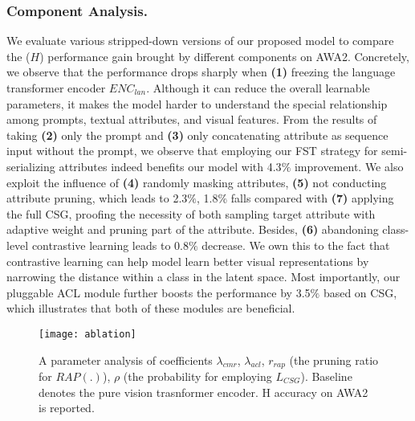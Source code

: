 \documentclass[letterpaper]{article} \usepackage{aaai23}  \usepackage{times}  \usepackage{helvet}  \usepackage{courier}  \usepackage[hyphens]{url}  \usepackage{graphicx} \urlstyle{rm} \def\UrlFont{\rm}  \usepackage{natbib}  \usepackage{caption} \frenchspacing  \setlength{\pdfpagewidth}{8.5in}  \setlength{\pdfpageheight}{11in}  \usepackage{algorithm}
\newcommand{\fy}[1]{{\color{black}#1}}
\begin{document}
\subsubsection{\textbf{Component Analysis.}}
We evaluate various stripped-down versions of our proposed model to compare the  ($H$) performance gain brought by different components on AWA2.
Concretely, we observe that the performance drop{s} sharply when 
\textbf{(1)} freezing the language transformer encoder $ENC_{lan}$. Although it
  \fy{can} reduce the overall learnable parameters, it makes the model hard{er} to understand the special relationship among prompts, textual attributes, and visual features.
From the results of taking \textbf{(2)} only the prompt and \textbf{(3)} only concatenating attribute as sequence input without the prompt, we observe that employing our FST strategy for semi-serializing attributes
indeed benefit{s} our model with 4.3$\%$ improvement.
We also exploit the influence of \textbf{(4)} {randomly} masking attributes, \textbf{(5)}  not conducting attribute pruning, which leads to 2.3$\%$, 1.8$\%$ falls compared with \textbf{(7)} applying the full CSG, proofing the necessity of both sampling target attribute with adaptive weight and pruning part of the attribute.
Besides,  \textbf{(6)} abandoning class-level contrastive learning leads to 0.8$\%$ decrease.
We own this to the fact that contrastive learning can help model learn better visual representations by narrowing  the distance within a class in the latent space.
Most importantly, our pluggable ACL module {further}
boosts the  performance by 3.5$\%$ based on CSG, which illustrates that both of these modules are {beneficial.}

\begin{figure}[htbp]
  \centering
   \vspace{-5pt}
  \texttt{[image: ablation]}
  \vspace{-5pt}
  \caption{A parameter analysis of coefficients $\lambda_{cmr}$, $\lambda_{acl}$, $r_{rap}$ (the pruning ratio for $RAP(.)$), $\rho$ (the probability for employing $L_{CSG}$). Baseline denotes the pure vision trasnformer encoder.
  {\rm{H} accuracy on AWA2 is reported.}
}
  \label{fig:parameter}
  \vspace{-10pt}
\end{figure}
\end{document}
